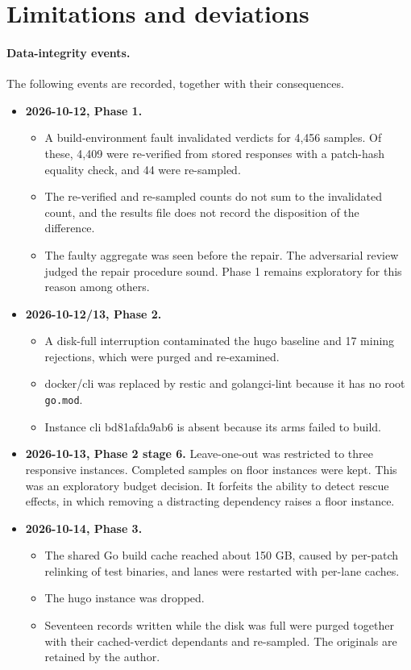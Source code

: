 \section{Limitations and deviations}\label{sec:lim}

\paragraph{Data-integrity events.} The following events are recorded, together with their consequences.

\begin{itemize}
\item \textbf{2026-10-12, Phase 1.}
  \begin{itemize}
  \item A build-environment fault invalidated verdicts for 4,456 samples. Of these, 4,409 were re-verified from stored responses with a patch-hash equality check, and 44 were re-sampled.
  \item The re-verified and re-sampled counts do not sum to the invalidated count, and the results file does not record the disposition of the difference.
  \item The faulty aggregate was seen before the repair. The adversarial review judged the repair procedure sound. Phase 1 remains exploratory for this reason among others.
  \end{itemize}
\item \textbf{2026-10-12/13, Phase 2.}
  \begin{itemize}
  \item A disk-full interruption contaminated the hugo baseline and 17 mining rejections, which were purged and re-examined.
  \item docker/cli was replaced by restic and golangci-lint because it has no root \texttt{go.mod}.
  \item Instance cli bd81afda9ab6 is absent because its arms failed to build.
  \end{itemize}
\item \textbf{2026-10-13, Phase 2 stage 6.} Leave-one-out was restricted to three responsive instances. Completed samples on floor instances were kept. This was an exploratory budget decision. It forfeits the ability to detect rescue effects, in which removing a distracting dependency raises a floor instance.
\item \textbf{2026-10-14, Phase 3.}
  \begin{itemize}
  \item The shared Go build cache reached about 150 GB, caused by per-patch relinking of test binaries, and lanes were restarted with per-lane caches.
  \item The hugo instance was dropped.
  \item Seventeen records written while the disk was full were purged together with their cached-verdict dependants and re-sampled. The originals are retained by the author.
  \end{itemize}
\end{itemize}


